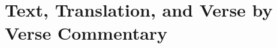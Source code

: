 \documentclass[11pt,twoside,openany]{book}
\begin{document}
\frontmatter

\lhead[\small\thepage]{\small\leftmark}
\chead[]{}
\cfoot[]{}


\newpage
 

\newpage


\newpage


\newpage


\newpage



\tableofcontents

\mainmatter

\part{Text, Translation, and Verse by Verse Commentary}



\end{document}
